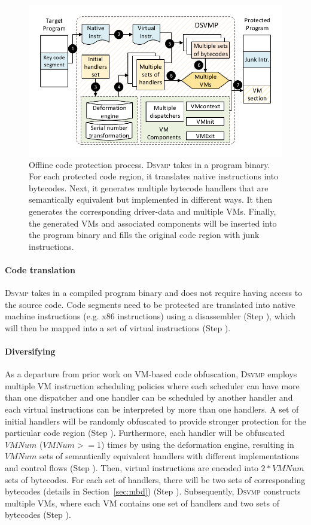 \documentclass[times]{secauth}
\newcommand{\DSVMP}{\textsc{Dsvmp }}
\begin{document}
\begin{figure}[!t]
  \centering
  \includegraphics[width=1.0\columnwidth]{figure/figtwo.pdf}
  \caption{Offline code protection process. \DSVMP takes in a program binary. For each protected code region, it translates native instructions into bytecodes. Next, it generates multiple bytecode handlers that are semantically equivalent but implemented in different ways. It then generates the corresponding driver-data and multiple VMs. Finally, the generated VMs and associated components will be inserted into the program binary and fills the original code region with junk instructions.}\label{fig:Fig.2}
\end{figure}

\paragraph*{Code translation}
\DSVMP takes in a compiled program binary and does not require having access to the source code.
Code segments need to be protected are translated into native machine instructions (e.g. x86 instructions)
using a disassembler (Step ), which will then be mapped into a set of virtual instructions (Step ).

\paragraph*{Diversifying}
As a departure from prior work on VM-based code obfuscation, \DSVMP employs multiple VM instruction scheduling policies
where each scheduler can have more than one dispatcher and one handler can be scheduled by another handler
and each virtual instructions can be interpreted by more than one handlers.
A set of initial handlers will be randomly obfuscated to provide stronger protection for the particular code region (Step ).
Furthermore, each handler will be obfuscated $VMNum$ ($VMNum >= 1$) times by using the deformation engine, resulting in $VMNum$ sets of semantically equivalent handlers with different implementations and control flows (Step ). Then, virtual instructions are encoded into $2*VMNum$ sets of bytecodes. For each set of handlers, there will be two sets of corresponding bytecodes (details in Section~\ref {sec:mbd}) (Step ). Subsequently, \DSVMP constructs multiple VMs, where each VM contains one set of handlers and two sets of bytecodes (Step ).
\end{document}
